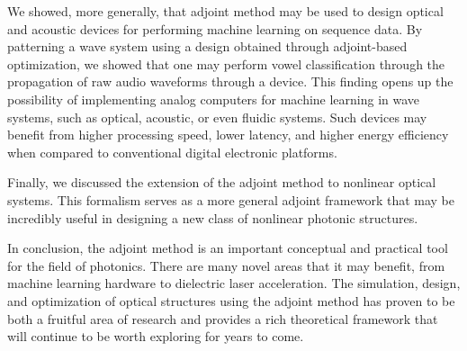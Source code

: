 We showed, more generally, that adjoint method may be used to design optical and acoustic devices for performing machine learning on sequence data.  By patterning a wave system using a design obtained through adjoint-based optimization, we showed that one may perform vowel classification through the propagation of raw audio waveforms through a device.  This finding opens up the possibility of implementing analog computers for machine learning in wave systems, such as optical, acoustic, or even fluidic systems.  Such devices may benefit from higher processing speed, lower latency, and higher energy efficiency when compared to conventional digital electronic platforms.

Finally, we discussed the extension of the adjoint method to nonlinear optical systems.
This formalism serves as a more general adjoint framework that may be incredibly useful in designing a new class of nonlinear photonic structures.

In conclusion, the adjoint method is an important conceptual and practical tool for the field of photonics.  There are many novel areas that it may benefit, from machine learning hardware to dielectric laser acceleration.  The simulation, design, and optimization of optical structures using the adjoint method has proven to be both a fruitful area of research and provides a rich theoretical framework that will continue to be worth exploring for years to come.
